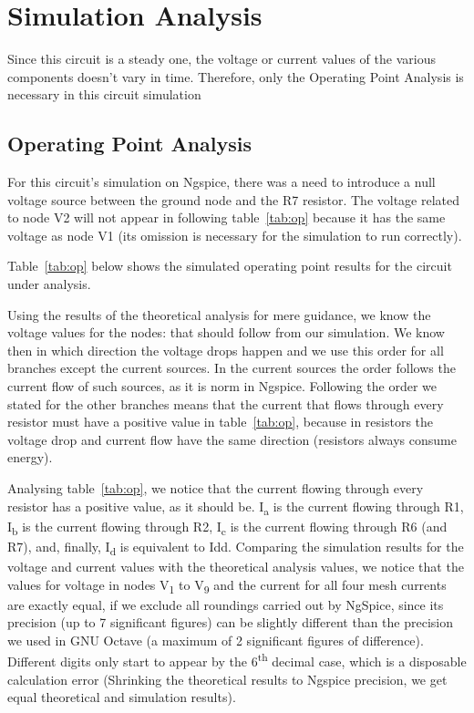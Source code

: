 \section{Simulation Analysis}
\label{sec:simulation}

Since this circuit is a steady one, the voltage or current values of the various components doesn't vary in time. Therefore, only the Operating Point Analysis is necessary in this circuit simulation

\subsection{Operating Point Analysis}


For this circuit's simulation on Ngspice, there was a need to introduce a null voltage source between the ground node and the R7 resistor. The voltage related to node V2 will not appear in following table~\ref{tab:op} because it has the same voltage as node V1 (its omission is necessary for the simulation to run correctly).

Table~\ref{tab:op} below shows the simulated operating point results for the circuit
under analysis.

Using the results of the theoretical analysis for mere guidance, we know the voltage values for the nodes: that should follow from our simulation. We know then in which direction the voltage drops happen and we use this order for all branches except the current sources. In the current sources the order follows the current flow of such sources, as it is norm in Ngspice. Following the order we stated for the other branches means that the current that flows through every resistor must have a positive value in table~\ref{tab:op}, because in resistors the voltage drop and current flow have the same direction (resistors always consume energy).

Analysing table~\ref{tab:op}, we notice that the current flowing through every resistor has a positive value, as it should be. I\textsubscript{a} is the current flowing through R1, I\textsubscript{b} is the current flowing through R2, I\textsubscript{c} is the current flowing through R6 (and R7), and, finally, I\textsubscript{d} is equivalent to Idd.
Comparing the simulation results for the voltage and current values with the theoretical analysis values, we notice that the values for voltage in nodes V\textsubscript{1} to V\textsubscript{9} and the current for all four mesh currents are exactly equal, if we exclude all roundings carried out by NgSpice, since its precision (up to 7 significant figures) can be slightly different than the precision we used in GNU Octave (a maximum of 2 significant figures of difference). Different digits only start to appear by the 6\textsuperscript{th} decimal case, which is a disposable calculation error (Shrinking the theoretical results to Ngspice precision, we get equal theoretical and simulation results).

